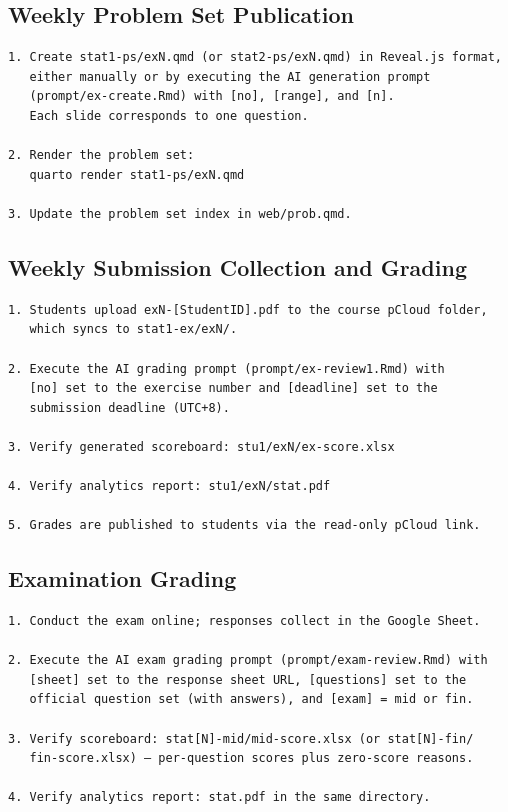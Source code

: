 \documentclass[
]{article}
\begin{document}
\subsection{Weekly Problem Set
Publication}\label{weekly-problem-set-publication}

\begin{verbatim}
1. Create stat1-ps/exN.qmd (or stat2-ps/exN.qmd) in Reveal.js format,
   either manually or by executing the AI generation prompt
   (prompt/ex-create.Rmd) with [no], [range], and [n].
   Each slide corresponds to one question.

2. Render the problem set:
   quarto render stat1-ps/exN.qmd

3. Update the problem set index in web/prob.qmd.
\end{verbatim}

\subsection{Weekly Submission Collection and
Grading}\label{weekly-submission-collection-and-grading}

\begin{verbatim}
1. Students upload exN-[StudentID].pdf to the course pCloud folder,
   which syncs to stat1-ex/exN/.

2. Execute the AI grading prompt (prompt/ex-review1.Rmd) with
   [no] set to the exercise number and [deadline] set to the
   submission deadline (UTC+8).

3. Verify generated scoreboard: stu1/exN/ex-score.xlsx

4. Verify analytics report: stu1/exN/stat.pdf

5. Grades are published to students via the read-only pCloud link.
\end{verbatim}

\subsection{Examination Grading}\label{examination-grading}

\begin{verbatim}
1. Conduct the exam online; responses collect in the Google Sheet.

2. Execute the AI exam grading prompt (prompt/exam-review.Rmd) with
   [sheet] set to the response sheet URL, [questions] set to the
   official question set (with answers), and [exam] = mid or fin.

3. Verify scoreboard: stat[N]-mid/mid-score.xlsx (or stat[N]-fin/
   fin-score.xlsx) — per-question scores plus zero-score reasons.

4. Verify analytics report: stat.pdf in the same directory.
\end{verbatim}
\end{document}

